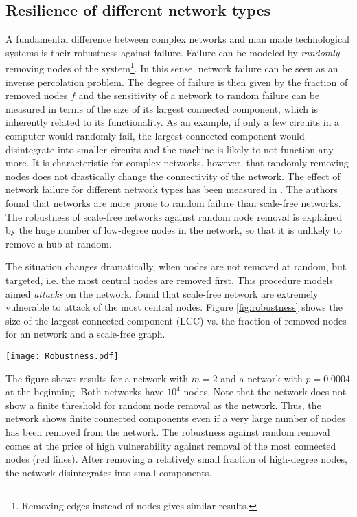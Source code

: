 \subsection{Resilience of different network types}\label{sec:resilience}
A fundamental difference between complex networks and man made technological systems is their robustness against failure.
Failure can be modeled by \emph{randomly} removing nodes of the system\footnote{Removing edges instead of nodes gives similar results.}.
In this sense, network failure can be seen as an inverse percolation problem.
The degree of failure is then given by the fraction of removed nodes $f$ and the sensitivity of a network to random failure can be measured in terms of the size of its largest connected component, which is inherently related to its functionality.
As an example, if only a few circuits in a computer would randomly fail, the largest connected component would disintegrate into smaller circuits and the machine is likely to not function any more.
It is characteristic for complex networks, however, that randomly removing nodes does not drastically change the connectivity of the network.
The effect of network failure for different network types has been measured in \citep{Albert:2000}.
The authors found that \ER networks are more prone to random failure than scale-free networks.
The robustness of scale-free networks against random node removal is explained by the huge number of low-degree nodes in the network, so that it is unlikely to remove a hub at random.

The situation changes dramatically, when nodes are not removed at random, but targeted, i.e. the most central nodes are removed first.
This procedure models aimed \emph{attacks} on the network.
\citeauthor{Albert:2000} found that scale-free network are extremely vulnerable to attack of the most central nodes.
Figure \ref{fig:robustness} shows the size of the largest connected component (LCC) vs. the fraction of removed nodes for an \ER network and a scale-free \BA graph.
%
\begin{SCfigure}
\texttt{[image: Robustness.pdf]}
\caption{Robustness of a \BA  (BA) network and an \ER  (ER) graph to random failure (grey dashed line) and targeted attack (red).
Red lines represent the size of the LCC under targeted removal of the most connected nodes.
The size of the LCC remains finite for the \BA network under random failure even for a large number of removed nodes.
From \citet{Albert:2000}.
}
\label{fig:robustness}
\end{SCfigure}
%
The figure shows results for a \BA network with $m=2$ and a \ER network with $p=0.0004$ at the beginning.
Both networks have $10^4$ nodes.
Note that the \BA network does not show a finite threshold for random node removal as the \ER network.
Thus, the network shows finite connected components even if a very large number of nodes has been removed from the network.
The robustness against random removal comes at the price of high vulnerability against removal of the most connected nodes (red lines).
After removing a relatively small fraction of high-degree nodes, the \BA network disintegrates into small components.


